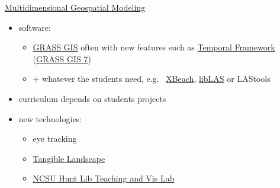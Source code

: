 \documentclass[xcolor={dvipsnames,usenames},beamer]{beamer}
\begin{document}
\begin{frame}{\coursesTitle}

\begin{columns}[c]


\begin{block}{\href{http://courses.ncsu.edu/mea592/common/}%
  {Multidimensional Geospatial Modeling}}

\begin{itemize}
 \item software:
 \begin{itemize}
   \item \href{http://grass.osgeo.org}{GRASS GIS}
   {\scriptsize
    often with new features such as
    \href{http://grass.osgeo.org/grass70/manuals/temporalintro.html}{Temporal Framework}
    (\href{http://grass.osgeo.org/grass7/}{GRASS GIS 7})
   }
  \item + whatever the students need, e.g.~%
    \href{http://oss.deltares.nl/web/xbeach/}{XBeach}, \href{http://www.liblas.org/}{libLAS}
    or LAStools
 \end{itemize}

 \item curriculum depends on students projects
 \item new technologies:
  \begin{itemize}
   \item eye tracking
   \item \href{http://geospatial.ncsu.edu/osgeorel/tangible-landscape.html}{Tangible Landscape}
   \item \href{https://www.lib.ncsu.edu/spaces/teaching-and-visualization-lab}%
           {NCSU Hunt Lib Teaching and Vis Lab}
  \end{itemize}
\end{itemize}

\end{block}



\end{columns}
\end{frame}
\end{document}
